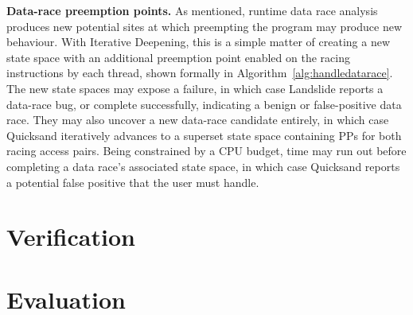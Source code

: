 {\bf Data-race preemption points.}
As mentioned, runtime data race analysis produces new potential sites at which preempting the program may produce new behaviour.
With Iterative Deepening, this is a simple matter of creating a new state space with an additional preemption point enabled on the racing instructions by each thread, shown formally in Algorithm~\ref{alg:handledatarace}.
The new state spaces may expose a failure, in which case Landslide reports a data-race bug,
or complete successfully, indicating a benign or false-positive data race.
They may also uncover a new data-race candidate entirely, %
in which case Quicksand iteratively advances to a superset state space containing PPs for both racing access pairs.
Being constrained by a CPU budget,
time may run out before completing a data race's associated state space,
in which case Quicksand reports a potential false positive that the user must handle.

\section{Verification}

\section{Evaluation}

